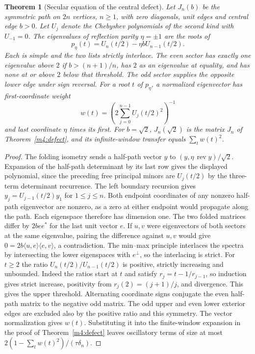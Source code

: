 \documentclass[11pt,reqno]{amsart}
\newtheorem{theorem}{Theorem}[section]
\theoremstyle{definition}
\theoremstyle{remark}
\numberwithin{equation}{section}
\begin{document}
\begin{theorem}[Secular equation of the central defect]\label{m11:defect}
Let $J_n(b)$ be the symmetric path on $2n$ vertices, $n\ge1$,
with zero diagonals, unit edges and central edge $b>0$.
Let $U_j$ denote the Chebyshev polynomials of the second kind
with $U_{-1}=0$. The eigenvalues of reflection parity $\eta=\pm1$ are
the roots of
\[
 p_\eta(t)=U_n(t/2)-\eta b U_{n-1}(t/2).
\]
Each is simple and the two lists strictly interlace.
The even sector has exactly one eigenvalue above $2$ if
$b>(n+1)/n$, has $2$ as an eigenvalue at equality, and has none
at or above $2$ below that threshold. The odd sector supplies
the opposite lower edge under sign reversal. For a root $t$ of
$p_\eta$, a normalized eigenvector has first-coordinate weight
\[
 w(t)=\left(2\sum_{j=0}^{n-1}U_j(t/2)^2\right)^{-1}
\]
and last coordinate $\eta$ times its first. For $b=\sqrt2$,
$J_n(\sqrt2)$ is the matrix $J_n$ of Theorem~\ref{m4:defect}, and
its infinite-window transfer equals $\sum_t w(t)^2$.
\end{theorem}
\begin{proof}
The folding isometry sends a half-path vector $y$ to
$(y,\eta\,\operatorname{rev} y)/\sqrt2$. Expansion of the half-path
determinant by its last row gives the displayed polynomial, since
the preceding free principal minors are $U_j(t/2)$ by the
three-term determinant recurrence. The left boundary recursion
gives $y_j=U_{j-1}(t/2)y_1$ for $1\le j\le n$. Both endpoint
coordinates of any nonzero half-path eigenvector are nonzero, as
a zero at either endpoint would propagate along the path.
Each eigenspace therefore has dimension one. The two folded
matrices differ by $2b ee^*$ for the last unit vector $e$.
If $u,v$ were eigenvectors of both sectors at the same eigenvalue,
pairing the difference against $u,v$ would give
$0=2b\langle u,e\rangle\langle e,v\rangle$, a contradiction.
The min--max principle interlaces the spectra by intersecting the
lower eigenspaces with $e^\perp$, so the interlacing is strict.
For $t\ge2$ the ratio $U_n(t/2)/U_{n-1}(t/2)$ is positive,
strictly increasing and unbounded. Indeed the ratios start at
$t$ and satisfy $r_j=t-1/r_{j-1}$, so induction gives strict increase,
positivity from $r_j(2)=(j+1)/j$, and divergence.
This gives the upper threshold. Alternating coordinate signs
conjugate the even half-path matrix to the negative odd matrix.
The odd upper and even lower exterior edges are excluded also by
the positive ratio and this symmetry. The vector normalization
gives $w(t)$. Substituting it into the finite-window expansion in
the proof of Theorem~\ref{m4:defect} leaves oscillatory terms of size
at most $2(1-\sum_t w(t)^2)/(\tau\delta_n)$.
\end{proof}
\end{document}
